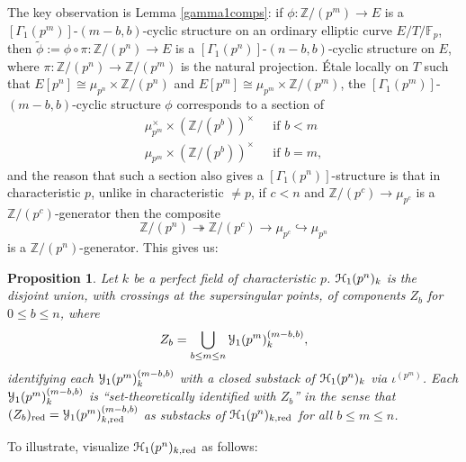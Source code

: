 \documentclass[11pt]{amsart}
\newtheorem{proposition}[subsection]{Proposition}
\theoremstyle{definition}
\begin{document}
The key observation is Lemma \ref{gamma1comps}: if $\phi: \mathbb{Z}/(p^m) \rightarrow E$ is a $[\Gamma_1(p^m)]$-$(m-b,b)$-cyclic structure on an ordinary elliptic curve $E/T/\mathbb{F}_p$, then $\widetilde{\phi}:=\phi\circ\pi: \mathbb{Z}/(p^n) \rightarrow E$ is a $[\Gamma_1(p^n)]$-$(n-b,b)$-cyclic structure on $E$, where $\pi: \mathbb{Z}/(p^n) \rightarrow \mathbb{Z}/(p^m)$ is the natural projection. \'Etale locally on $T$ such that $E[p^n] \cong \mu_{p^n} \times \mathbb{Z}/(p^n)$ and $E[p^m] \cong \mu_{p^m} \times \mathbb{Z}/(p^m)$, the $[\Gamma_1(p^m)]$-$(m-b,b)$-cyclic structure $\phi$ corresponds to a section of 
\begin{align*}
\mu_{p^m}^\times \times (\mathbb{Z}/(p^b))^\times &\:\:\: \textrm{if $b<m$} \\
\mu_{p^m} \times (\mathbb{Z}/(p^b))^\times &\:\:\: \textrm{if $b=m$},
\end{align*}
and the reason that such a section also gives a $[\Gamma_1(p^n)]$-structure is that in characteristic $p$, unlike in characteristic $\neq p$, if $c <n$ and $\mathbb{Z}/(p^c) \rightarrow \mu_{p^c}$ is a $\mathbb{Z}/(p^c)$-generator then the composite 
\begin{displaymath}
\mathbb{Z}/(p^n) \twoheadrightarrow \mathbb{Z}/(p^c) \rightarrow \mu_{p^c} \hookrightarrow \mu_{p^n}
\end{displaymath}
is a $\mathbb{Z}/(p^n)$-generator. This gives us:
\begin{proposition}\label{y1comps}
Let $k$ be a perfect field of characteristic $p$. ${\mathbf{\EuScript{H}}}_1(p^n)_k$ is the disjoint union, with crossings at the supersingular points, of components $Z_b$ for $0 \leq b \leq n$, where 
\begin{displaymath}
Z_b = \bigcup_{b\leq m \leq n} {\mathbf{\EuScript{Y}}}_1(p^m)^{(m-b,b)}_k,
\end{displaymath}
identifying each ${\mathbf{\EuScript{Y}}}_1(p^m)^{(m-b,b)}_k$ with a closed substack of ${\mathbf{\EuScript{H}}}_1(p^n)_k$ via $\iota^{(p^m)}$. Each ${\mathbf{\EuScript{Y}}}_1(p^m)^{(m-b,b)}_k$ is ``set-theoretically identified with $Z_b$'' in the sense that $(Z_b)_{\mathrm{red}} = {\mathbf{\EuScript{Y}}}_1(p^m)^{(m-b,b)}_{k,\mathrm{red}}$ as substacks of ${\mathbf{\EuScript{H}}}_1(p^n)_{k,\mathrm{red}}$ for all $b\leq m \leq n$.
\end{proposition}

To illustrate, visualize ${\mathbf{\EuScript{H}}}_1(p^n)_{k,\mathrm{red}}$ as follows:
\end{document}
